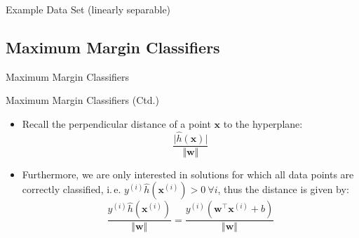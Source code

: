 \begin{frame}{Example Data Set (linearly separable)}{}
\end{frame}


\subsection{Maximum Margin Classifiers}

\begin{frame}{Maximum Margin Classifiers}{}\important
\end{frame}


\begin{frame}{Maximum Margin Classifiers (Ctd.)}{}
	\begin{itemize}
		\item Recall the perpendicular distance of a point $\bm{x}$ to the hyperplane:
		\begin{equation}
			\frac{\vert \widehat{h}(\bm{x}) \vert}{\Vert \bm{w} \Vert}
		\end{equation}
		\item Furthermore, we are only interested in solutions for which all data points are correctly classified, i.\,e. 
			$y^{(i)} \widehat{h}(\bm{x}^{(i)}) > 0\ \forall i$, thus the distance is given by:
		\begin{equation}
			\frac{y^{(i)} \widehat{h}(\bm{x}^{(i)})}{\Vert \bm{w} \Vert} = \frac{y^{(i)} (\bm{w}^{\intercal} \bm{x}^{(i)} + b)}{\Vert \bm{w} \Vert}
		\end{equation}
	\end{itemize}
\end{frame}


